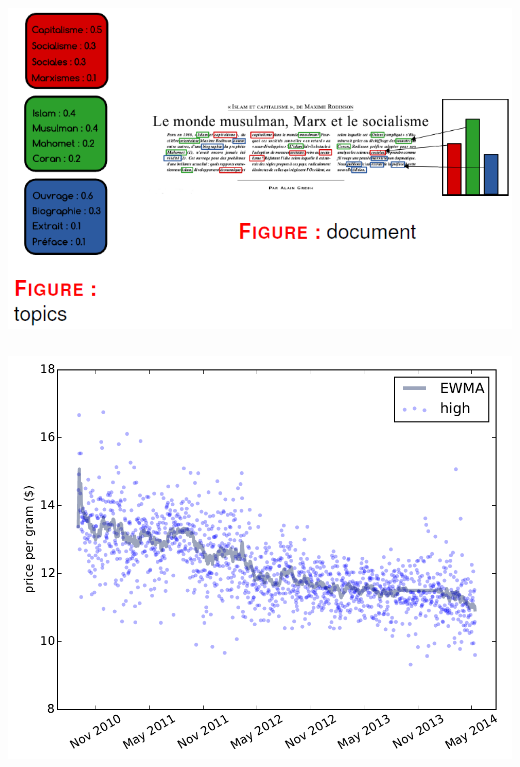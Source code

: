 \documentclass[11pt]{beamer}
\newenvironment{slide}[1]{%
\begin{frame}[environment=slide]
\frametitle{#1}
}{%
\end{frame}
}
\begin{document}
\begin{slide}{}

\includegraphics[scale=0.35]{A6topicrecognition}

\end{slide}

\begin{slide}{}

\includegraphics[scale=0.25]{A7regression}

\end{slide}
\end{document}
